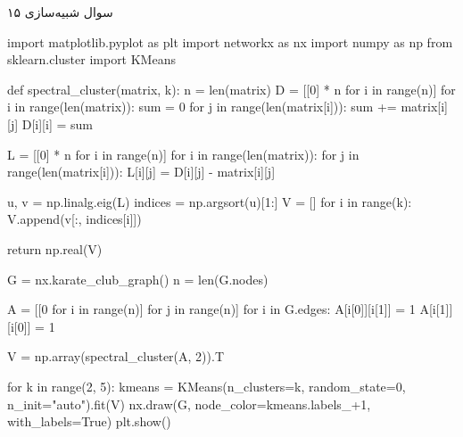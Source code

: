 سوال شبیه‌سازی ۱۵

\begin{latin}
\begin{python}
import matplotlib.pyplot as plt
import networkx as nx
import numpy as np
from sklearn.cluster import KMeans

def spectral_cluster(matrix, k):
    n = len(matrix)
    D = [[0] * n for i in range(n)]
    for i in range(len(matrix)):
        sum = 0
        for j in range(len(matrix[i])):
            sum += matrix[i][j]
        D[i][i] = sum

    L = [[0] * n for i in range(n)]
    for i in range(len(matrix)):
        for j in range(len(matrix[i])):
            L[i][j] = D[i][j] - matrix[i][j]

    u, v = np.linalg.eig(L)
    indices = np.argsort(u)[1:]
    V = []
    for i in range(k):
        V.append(v[:, indices[i]])

    return np.real(V)

G = nx.karate_club_graph()
n = len(G.nodes)

A = [[0 for i in range(n)] for j in range(n)]
for i in G.edges:
    A[i[0]][i[1]] = 1
    A[i[1]][i[0]] = 1

V = np.array(spectral_cluster(A, 2)).T

for k in range(2, 5):
    kmeans = KMeans(n_clusters=k, random_state=0, n_init="auto").fit(V)
    nx.draw(G, node_color=kmeans.labels_+1, with_labels=True)
    plt.show()
\end{python}
\end{latin}